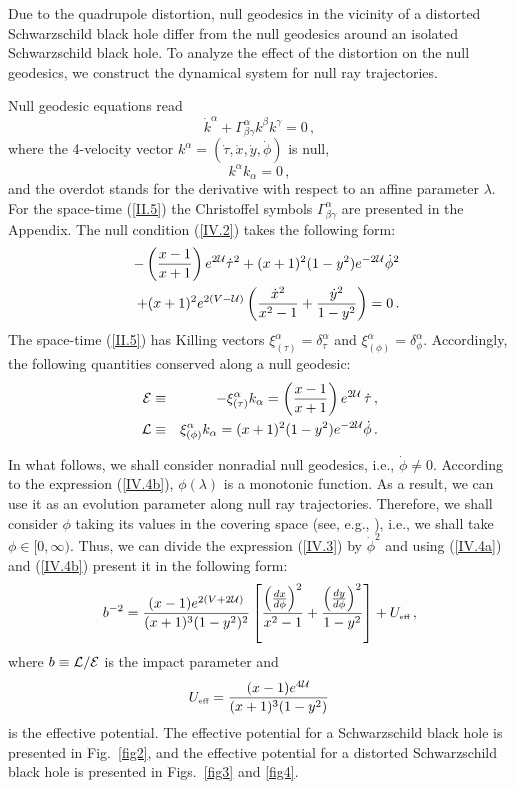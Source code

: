 \documentclass[twocolumn,showpacs,preprintnumbers,amsmath,amssymb,floatfix,nofootinbib]{revtex4-1}
\newcommand{\be}{\begin{equation}}
\newcommand{\ee}{\end{equation}}
\newcommand{\ba}{\begin{eqnarray}}
\newcommand{\ea}{\end{eqnarray}}
\newcommand{\non}{\nonumber}
\newcommand{\eq}[1]{(\ref{#1})}
\newcommand{\n}[1]{\label{#1}}
\newcommand{\ind}[1]{\mbox{\tiny #1}}
\newcommand{\cu}{{\cal U}}
\begin{document}
Due to the quadrupole distortion, null geodesics in the vicinity of a distorted Schwarzschild black hole differ from the null geodesics around an isolated Schwarzschild black hole. To analyze the effect of the distortion on the null geodesics, we construct the dynamical system for null ray trajectories. 

Null geodesic equations read
\be\n{IV.1}
\dot{k}^{\alpha}+\Gamma^{\alpha}_{\beta\gamma}k^{\beta}k^{\gamma}=0\,,
\ee
where the 4-velocity vector $k^{\alpha}=(\dot{\tau},\dot{x},\dot{y},\dot{\phi})$ is null,
\be\n{IV.2}
k^{\alpha}k_{\alpha}=0\,,
\ee
and the overdot stands for the derivative with respect to an affine parameter $\lambda$. For the space-time \eq{II.5} the Christoffel symbols $\Gamma^{\alpha}_{\beta\gamma}$ are presented in the Appendix. The null condition \eq{IV.2} takes the following form:
\ba\n{IV.3}
&&-\left(\frac{x-1}{x+1}\right)e^{2\cu}\dot{\tau}^{2}+(x+1)^{2}(1-y^{2})e^{-2\cu}\dot{\phi}^{2}\non\\
&&+(x+1)^{2}e^{2(V-\cu)}\left(\frac{\dot{x}^{2}}{x^{2}-1}+\frac{\dot{y}^{2}}{1-y^{2}}\right)=0\,.
\ea
The space-time \eq{II.5} has Killing vectors $\xi^{\alpha}_{(\tau)}=\delta^{\alpha}_{\tau}$ and $\xi^{\alpha}_{(\phi)}=\delta^{\alpha}_{\phi}$. Accordingly, the following quantities conserved along a null geodesic:
\ba
{\cal E}&\equiv&-\xi^{\alpha}_{(\tau)}k_{\alpha}=\left(\frac{x-1}{x+1}\right)e^{2\cu}\,\dot{\tau}\,,\n{IV.4a}\\
{\cal L}&\equiv&\xi^{\alpha}_{(\phi)}k_{\alpha}=(x+1)^{2}(1-y^{2})e^{-2\cu}\dot{\phi}\,.\n{IV.4b}
\ea

In what follows, we shall consider nonradial null geodesics, i.e., $\dot{\phi}\ne0$. According to the expression \eq{IV.4b}, $\phi(\lambda)$ is a monotonic function. As a result, we can use it as an evolution parameter along null ray trajectories. Therefore, we shall consider $\phi$ taking its values in the covering space (see, e.g., \cite{Hawking}), i.e., we shall take $\phi\in[0,\infty)$. Thus, we can divide the expression \eq{IV.3} by $\dot{\phi}^2$ and using \eq{IV.4a} and \eq{IV.4b} present it in the following form:
\be\n{IV.5}
b^{-2}=\frac{(x-1)e^{2(V+2\cu)}}{(x+1)^3(1-y^2)^2}\left[\frac{\left(\frac{dx}{d\phi}\right)^2}{x^{2}-1}+\frac{\left(\frac{dy}{d\phi}\right)^2}{1-y^{2}}\right]+U_{\ind{eff}}\,,
\ee
where $b\equiv{\cal L}/{\cal E}$ is the impact parameter and
\be\n{IV.6}
U_{\ind{eff}}=\frac{(x-1)e^{4\cu}}{(x+1)^3(1-y^2)}\,
\ee
is the effective potential. The effective potential for a Schwarzschild black hole is presented in Fig.~\ref{fig2}, and the effective potential for a distorted Schwarzschild black hole is presented in Figs.~\ref{fig3} and \ref{fig4}.
\end{document}
